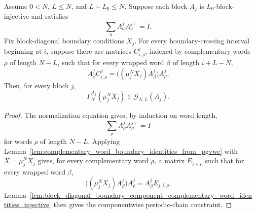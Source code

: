 \begin{lemma}
    \label{lem:block_diagonal_boundary_component_pgvwc_comparison_injective}
    \leanok
    Assume \(0<N\), \(L\le N\), and \(L+L_0\le N\). Suppose each block \(A_j\)
    is \(L_0\)-block-injective and satisfies
    \[
        \sum_a A^j_aA^{j\dagger}_a=I .
    \]
    Fix block-diagonal boundary conditions \(X_j\). For every boundary-crossing
    interval beginning at \(i\), suppose there are matrices \(C^j_{i,\rho}\),
    indexed by complementary words \(\rho\) of length \(N-L\), such that for
    every wrapped word \(\beta\) of length \(i+L-N\),
    \[
        A^j_\beta C^j_{i,\rho}
        =
        \bigl((\mu_j^NX_j)A^j_\beta\bigr)A^j_\rho .
    \]
    Then, for every block \(j\),
    \[
        \Gamma_N^{A_j}(\mu_j^NX_j)\in\mathcal G_{N,L}(A_j).
    \]
\end{lemma}

\begin{proof}
    \leanok
    The normalization equation gives, by induction on word length,
    \[
        \sum_\rho A^j_\rho A^{j\dagger}_\rho=I
    \]
    for words \(\rho\) of length \(N-L\). Applying
    Lemma~\ref{lem:complementary_word_boundary_identities_from_pgvwc} with
    \(X=\mu_j^NX_j\) gives, for every complementary word \(\rho\), a matrix
    \(E_{j,i,\rho}\) such that for every wrapped word \(\beta\),
    \[
        \bigl((\mu_j^NX_j)A^j_\beta\bigr)A^j_\rho
        =
        A^j_\beta E_{j,i,\rho}.
    \]
    Lemma~\ref{lem:block_diagonal_boundary_component_complementary_word_identities_injective}
    then gives the componentwise periodic-chain constraint.
\end{proof}

